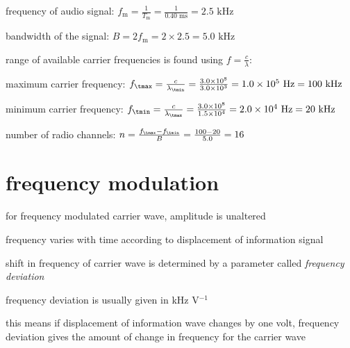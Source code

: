 \eqyskip frequency of audio signal: $f_\text{m} = \frac{1}{T_\text{m}} = \frac{1}{0.40 \text{ ms}} = 2.5 \text{ kHz}$
	
bandwidth of the signal: $B = 2 f_\text{m} = 2\times2.5 = 5.0 \text{ kHz}$

range of available carrier frequencies is found using $f=\frac{c}{\lambda}$:

maximum carrier frequency: $f_\tmax = \frac{c}{\lambda_\tmin} = \frac{3.0\times10^8}{3.0\times10^3} = 1.0\times10^5 \text{ Hz} = 100 \text{ kHz}$

minimum carrier frequency: $f_\tmin = \frac{c}{\lambda_\tmax} = \frac{3.0\times10^8}{1.5\times10^4} = 2.0\times10^4 \text{ Hz} = 20 \text{ kHz}$

\eqyskip number of radio channels: $n = \frac{f_\tmax - f_\tmin}{B} = \frac{100-20}{5.0} = 16$ \eoe



\section{frequency modulation}

for frequency modulated carrier wave, amplitude is unaltered

frequency varies with time according to displacement of information signal

\cmt shift in frequency of carrier wave is determined by a parameter called \emph{frequency deviation}

frequency deviation is usually given in kHz V$^{-1}$

this means if displacement of information wave changes by one volt, frequency deviation gives the amount of change in frequency for the carrier wave

